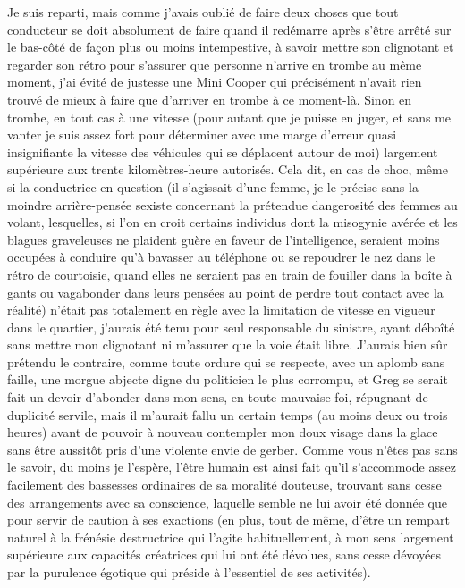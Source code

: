 Je suis reparti, mais comme j’avais oublié de faire deux choses que tout conducteur se doit absolument de faire quand il redémarre après s’être arrêté sur le bas-côté de façon plus ou moins intempestive, à savoir mettre son clignotant et regarder son rétro pour s’assurer que personne n’arrive en trombe au même moment, j’ai évité de justesse une Mini Cooper qui précisément n’avait rien trouvé de mieux à faire que d’arriver en trombe à ce moment-là. Sinon en trombe, en tout cas à une vitesse (pour autant que je puisse en juger, et sans me vanter je suis assez fort pour déterminer avec une marge d’erreur quasi insignifiante la vitesse des véhicules qui se déplacent autour de moi) largement supérieure aux trente kilomètres-heure autorisés. Cela dit, en cas de choc, même si la conductrice en question (il s’agissait d’une femme, je le précise sans la moindre arrière-pensée sexiste concernant la prétendue dangerosité des femmes au volant, lesquelles, si l’on en croit certains individus dont la misogynie avérée et les blagues graveleuses ne plaident guère en faveur de l’intelligence, seraient moins occupées à conduire qu’à bavasser au téléphone ou se repoudrer le nez dans le rétro de courtoisie, quand elles ne seraient pas en train de fouiller dans la boîte à gants ou vagabonder dans leurs pensées au point de perdre tout contact avec la réalité) n’était pas totalement en règle avec la limitation de vitesse en vigueur dans le quartier, j’aurais été tenu pour seul responsable du sinistre, ayant déboîté sans mettre mon clignotant ni m’assurer que la voie était libre. J’aurais bien sûr prétendu le contraire, comme toute ordure qui se respecte, avec un aplomb sans faille, une morgue abjecte digne du politicien le plus corrompu, et Greg se serait fait un devoir d’abonder dans mon sens, en toute mauvaise foi, répugnant de duplicité servile, mais il m’aurait fallu un certain temps (au moins deux ou trois heures) avant de pouvoir à nouveau contempler mon doux visage dans la glace sans être aussitôt pris d’une violente envie de gerber. Comme vous n’êtes pas sans le savoir, du moins je l’espère, l’être humain est ainsi fait qu’il s’accommode assez facilement des bassesses ordinaires de sa moralité douteuse, trouvant sans cesse des arrangements avec sa conscience, laquelle semble ne lui avoir été donnée que pour servir de caution à ses exactions (en plus, tout de même, d’être un rempart naturel à la frénésie destructrice qui l’agite habituellement, à mon sens largement supérieure aux capacités créatrices qui lui ont été dévolues, sans cesse dévoyées par la purulence égotique qui préside à l’essentiel de ses activités).

